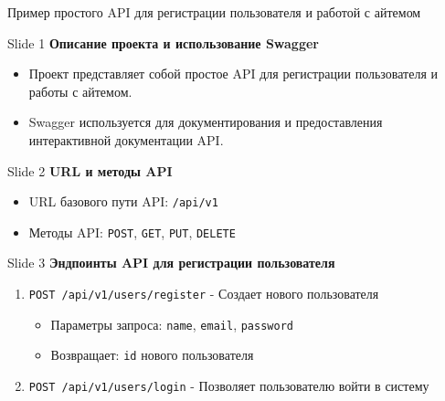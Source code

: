 \documentclass[
  ignorenonframetext,
  aspectratio=169,
  aspectratio=169]{beamer}
\newcommand{\passthrough}[1]{#1}
\providecommand{\tightlist}{%
  \setlength{\itemsep}{0pt}\setlength{\parskip}{0pt}}
\begin{document}
\begin{frame}[fragile]{Пример простого API для регистрации пользователя
и работой с айтемом}
\protect\hypertarget{ux43fux440ux438ux43cux435ux440-ux43fux440ux43eux441ux442ux43eux433ux43e-api-ux434ux43bux44f-ux440ux435ux433ux438ux441ux442ux440ux430ux446ux438ux438-ux43fux43eux43bux44cux437ux43eux432ux430ux442ux435ux43bux44f-ux438-ux440ux430ux431ux43eux442ux43eux439-ux441-ux430ux439ux442ux435ux43cux43eux43c-1}{}
\begin{block}{Slide 1}
\protect\hypertarget{slide-1}{}
\textbf{Описание проекта и использование Swagger}

\begin{itemize}
\tightlist
\item
  Проект представляет собой простое API для регистрации пользователя и
  работы с айтемом.
\item
  Swagger используется для документирования и предоставления
  интерактивной документации API.
\end{itemize}
\end{block}

\begin{block}{Slide 2}
\protect\hypertarget{slide-2}{}
\textbf{URL и методы API}

\begin{itemize}
\tightlist
\item
  URL базового пути API: \passthrough{\lstinline!/api/v1!}
\item
  Методы API: \passthrough{\lstinline!POST!},
  \passthrough{\lstinline!GET!}, \passthrough{\lstinline!PUT!},
  \passthrough{\lstinline!DELETE!}
\end{itemize}
\end{block}

\begin{block}{Slide 3}
\protect\hypertarget{slide-3}{}
\textbf{Эндпоинты API для регистрации пользователя}

\begin{enumerate}
\tightlist
\item
  \passthrough{\lstinline!POST /api/v1/users/register!} - Создает нового
  пользователя

  \begin{itemize}
  \tightlist
  \item
    Параметры запроса: \passthrough{\lstinline!name!},
    \passthrough{\lstinline!email!}, \passthrough{\lstinline!password!}
  \item
    Возвращает: \passthrough{\lstinline!id!} нового пользователя
  \end{itemize}
\item
  \passthrough{\lstinline!POST /api/v1/users/login!} - Позволяет
  пользователю войти в систему


\end{enumerate}
\end{block}
\end{frame}
\end{document}
